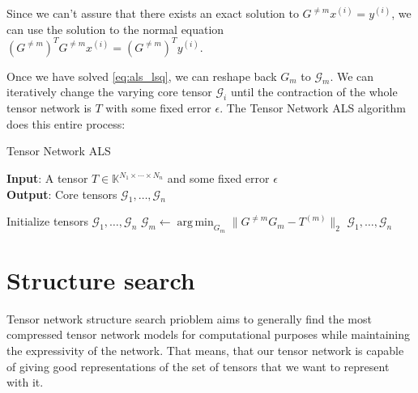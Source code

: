 \documentclass[11pt,a4paper,openright,oneside]{book}
\numberwithin{equation}{section}
\DeclareMathOperator*{\argmin}{arg\,min}
\begin{document}
{Since we can't assure that there exists an exact solution to $G^{\neq m} x^{(i)} = y^{(i)}$,
we can use the solution to the normal equation $(G^{\neq m})^T G^{\neq m} x^{(i)} = (G^{\neq m})^T y^{(i)}$.

Once we have solved \eqref{eq:als_lsq}, we can reshape back $G_m$ to $\mathcal{G}_m$.
We can iteratively change the varying core tensor $\mathcal{G}_i$ until the contraction of the whole tensor network
is $T$ with some fixed error $\epsilon$. The Tensor Network ALS algorithm does this entire process:

\begin{algorithm}[H]
    \caption{Tensor Network ALS}

    \hspace*{\algorithmicindent} \textbf{Input}: A tensor $T \in \mathbb{K}^{N_1 \times \cdots \times N_n}$ and some fixed error $\epsilon$ \\
    \hspace*{\algorithmicindent} \textbf{Output}: Core tensors $\mathcal{G}_1, \dots, \mathcal{G}_n$ 

    \begin{algorithmic}[1]
        \State Initialize tensors $\mathcal{G}_1, \dots, \mathcal{G}_n$
            \State $\mathcal{G}_m \leftarrow \argmin_{G_m} \|G^{\neq m} G_m - T^{(m)}\|_2$
            \EndFor
        \EndWhile
        \State \Return $\mathcal{G}_1, \dots, \mathcal{G}_n$

    \end{algorithmic}

\end{algorithm}


\section{Structure search}


Tensor network structure search prioblem aims to generally find the most compressed tensor network
models for computational purposes while maintaining the expressivity of the network. That means, that our
tensor network is capable of giving good representations of the set of tensors that we want to represent with it.

}
\end{document}
